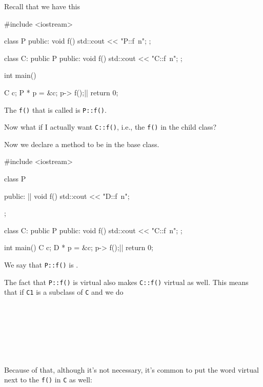 Recall that we have this

\begin{consolethree}[escapeinside=||]
#include <iostream>

class P
{
public:
     void f()
     {    
          std::cout << "P::f\ n";
     }
};

class C: public P
{
public:
     void f()
     {    
          std::cout << "C::f\ n";
     }
};

int main()
{   
    C c;
    P * p = &c;
    p-> f();||
    return 0;

}
\end{consolethree}

The \verb!f()! that is called is \verb!P::f()!.

Now what if I actually want \verb!C::f()!, i.e., the \verb!f()! in the child class?

Now we declare a method to be  in the base class.

\begin{consolethree}[escapeinside=||]
#include <iostream>

class P{
public:
     || void f() { std::cout << "D::f\ n"; }

};

class C: public P
{
public:
     void f() { std::cout << "C::f\ n"; }
};

int main()
{   
    C c;
    D * p = &c;
    p-> f();||
    return 0;
}
\end{consolethree}

We say that \verb!P::f()! is .

The fact that \verb!P::f()! is virtual also makes \verb!C::f()! virtual as well. This means that if \verb!C1! is a subclass of \verb!C! and we do

\\
\\
\\
\\
\\
\\

Because of that, although it's not necessary, it's common to put the word virtual next to the \verb!f()! in \verb!C! as well:

